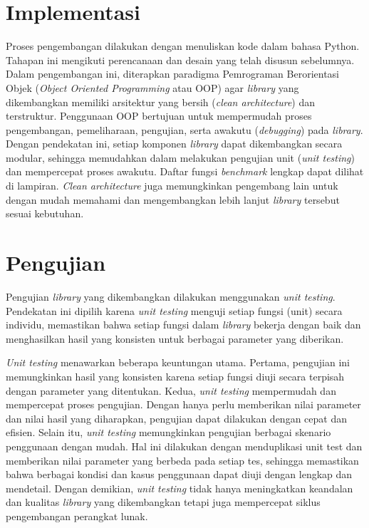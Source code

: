 \section{Implementasi}
Proses pengembangan dilakukan dengan menuliskan kode dalam bahasa Python. Tahapan ini mengikuti perencanaan dan desain yang telah disusun sebelumnya. Dalam pengembangan ini, diterapkan paradigma Pemrograman Berorientasi Objek (\textit{Object Oriented Programming} atau OOP) agar \textit{library} yang dikembangkan memiliki arsitektur yang bersih (\textit{clean architecture}) dan terstruktur. Penggunaan OOP bertujuan untuk mempermudah proses pengembangan, pemeliharaan, pengujian, serta awakutu (\textit{debugging}) pada \textit{library}. Dengan pendekatan ini, setiap komponen \textit{library} dapat dikembangkan secara modular, sehingga memudahkan dalam melakukan pengujian unit (\textit{unit testing}) dan mempercepat proses awakutu. Daftar fungsi \textit{benchmark} lengkap dapat dilihat di lampiran. \textit{Clean architecture} juga memungkinkan pengembang lain untuk dengan mudah memahami dan mengembangkan lebih lanjut \textit{library} tersebut sesuai kebutuhan.

\section{Pengujian}
Pengujian \textit{library} yang dikembangkan dilakukan menggunakan \textit{unit testing}. Pendekatan ini dipilih karena \textit{unit testing} menguji setiap fungsi (unit) secara individu, memastikan bahwa setiap fungsi dalam \textit{library} bekerja dengan baik dan menghasilkan hasil yang konsisten untuk berbagai parameter yang diberikan.

\textit{Unit testing} menawarkan beberapa keuntungan utama. Pertama, pengujian ini memungkinkan hasil yang konsisten karena setiap fungsi diuji secara terpisah dengan parameter yang ditentukan. Kedua, \textit{unit testing} mempermudah dan mempercepat proses pengujian. Dengan hanya perlu memberikan nilai parameter dan nilai hasil yang diharapkan, pengujian dapat dilakukan dengan cepat dan efisien. Selain itu, \textit{unit testing} memungkinkan pengujian berbagai skenario penggunaan dengan mudah. Hal ini dilakukan dengan menduplikasi unit test dan memberikan nilai parameter yang berbeda pada setiap tes, sehingga memastikan bahwa berbagai kondisi dan kasus penggunaan dapat diuji dengan lengkap dan mendetail. Dengan demikian, \textit{unit testing} tidak hanya meningkatkan keandalan dan kualitas \textit{library} yang dikembangkan tetapi juga mempercepat siklus pengembangan perangkat lunak.